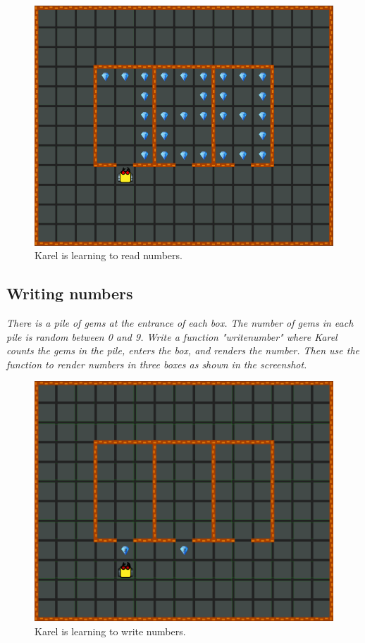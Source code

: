 {{\begin{figure}[!ht]
\begin{center}
\includegraphics[height=0.4\textwidth]{img/i01.png}
\end{center}
\vspace{-4mm}
\caption{Karel is learning to read numbers.}
\label{fig:g10}
\end{figure}



\subsection{Writing numbers}

{\em There is a pile of gems at the entrance of each box. The number of gems in each pile is random between 0 and 9. Write a function "writenumber" where Karel counts the gems in the pile, enters the box, and renders the number. Then use the function to render numbers in three boxes as shown in the screenshot. }

\newpage

\begin{figure}[!ht]
\begin{center}
\includegraphics[height=0.4\textwidth]{img/i02.png}
\end{center}
\vspace{-4mm}
\caption{Karel is learning to write numbers.}
\label{fig:g11}
\vspace{-10mm}
\end{figure}



}}
